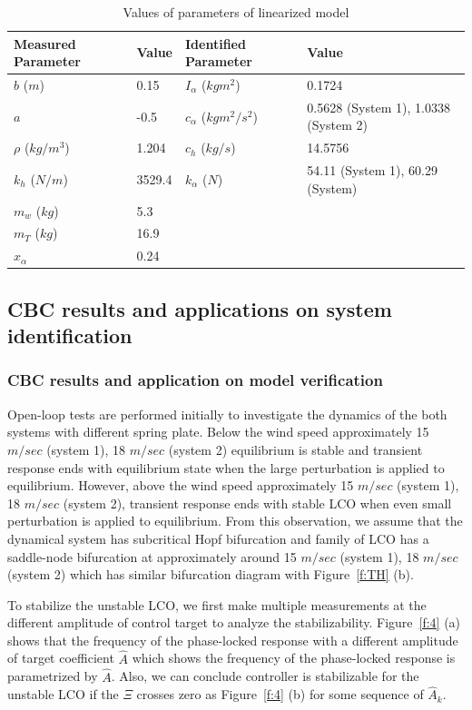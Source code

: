 \documentclass[openacc]{rsproca_new}%
\theoremstyle{own}
\newcommand{\Fref}[1]{Figure~\ref{#1}}
\begin{document}
\begin{table}[!ht]
\caption{Values of parameters of linearized model}%
\label{t2}
\begin{tabular}{llll}%
\hline
Measured Parameter & Value & Identified Parameter & Value\\
\hline
$b$ ($m$) & 0.15   & $I_{\alpha}$ ($kgm^2$) & 0.1724   \\
$a$ & -0.5 & $c_\alpha$ ($kgm^2/s^2$) & 0.5628 (System 1), 1.0338 (System 2)   \\
$\rho$ ($kg/m^3$) & 1.204  & $c_h$ ($kg/s$)  & 14.5756   \\
$k_{h}$ ($N/m$) & 3529.4   & $k_\alpha$ ($N$) & 54.11 (System 1), 60.29 (System)   \\
$m_w$ ($kg$) & 5.3   & & \\
$m_T$ ($kg$) &  16.9   & &  \\
$x_\alpha$ & 0.24 & & \\
\hline
\end{tabular}
\vspace*{-4pt}
\end{table}%

\subsection{CBC results and applications on system identification}\label{results}
\subsubsection{CBC results and application on model verification}\label{lin_sys}
Open-loop tests are performed initially to investigate the dynamics of the both systems with different spring plate. Below the wind speed approximately 15 $m/sec$ (system 1), 18 $m/sec$ (system 2) equilibrium is stable and transient response ends with equilibrium state when the large perturbation is applied to equilibrium. However, above the wind speed approximately 15 $m/sec$ (system 1), 18 $m/sec$ (system 2), transient response ends with stable LCO when even small perturbation is applied to equilibrium. From this observation, we assume that the dynamical system has subcritical Hopf bifurcation and family of LCO has a saddle-node bifurcation at approximately around 15 $m/sec$ (system 1), 18 $m/sec$ (system 2) which has similar bifurcation diagram with \Fref{f:TH} (b).

To stabilize the unstable LCO, we first make multiple measurements at the different amplitude of control target to analyze the stabilizability. \Fref{f:4} (a) shows that the frequency of the phase-locked response with a different amplitude of target coefficient $\hat A$ which shows the frequency of the phase-locked response is parametrized by $\hat A$. Also, we can conclude controller is stabilizable for the unstable LCO if the $\Xi$ crosses zero as \Fref{f:4} (b) for some sequence of $\hat A_k$.
\end{document}
